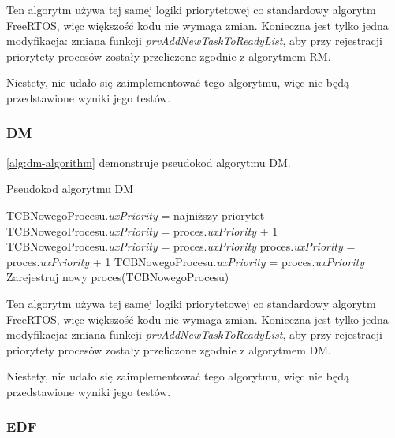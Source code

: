 \documentclass[../../main]{subfiles}
\begin{document}
Ten algorytm używa tej samej logiki priorytetowej co standardowy algorytm FreeRTOS, więc większość kodu nie wymaga zmian. Konieczna jest tylko jedna modyfikacja: zmiana funkcji \textit{prvAddNewTaskToReadyList}, aby przy rejestracji priorytety procesów zostały przeliczone zgodnie z algorytmem RM.

Niestety, nie udało się zaimplementować tego algorytmu, więc nie będą przedstawione wyniki jego testów.
\newpage

\subsubsection{DM}

\cref{alg:dm-algorithm} demonstruje pseudokod algorytmu DM.

\begin{algorithm}[H]
\caption{Pseudokod algorytmu DM}\label{alg:dm-algorithm}
\begin{algorithmic}[1]
    \State TCBNowegoProcesu.\textit{uxPriority} = najniższy priorytet
\Else
            \State TCBNowegoProcesu.\textit{uxPriority} = proces.\textit{uxPriority} + 1
            \State TCBNowegoProcesu.\textit{uxPriority} = proces.\textit{uxPriority}
            \State proces.\textit{uxPriority} = proces.\textit{uxPriority} + 1
        \Else
            \State TCBNowegoProcesu.\textit{uxPriority} = proces.\textit{uxPriority}
        \EndIf
    \EndFor
\EndIf
\State Zarejestruj nowy proces(TCBNowegoProcesu)
\end{algorithmic}
\end{algorithm}

Ten algorytm używa tej samej logiki priorytetowej co standardowy algorytm FreeRTOS, więc większość kodu nie wymaga zmian. Konieczna jest tylko jedna modyfikacja: zmiana funkcji \textit{prvAddNewTaskToReadyList}, aby przy rejestracji priorytety procesów zostały przeliczone zgodnie z algorytmem DM.

Niestety, nie udało się zaimplementować tego algorytmu, więc nie będą przedstawione wyniki jego testów.

\subsubsection{EDF}
\end{document}
